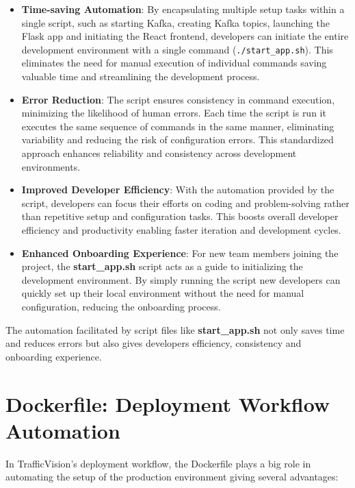 \begin{itemize}
    \item \textbf{Time-saving Automation}: By encapsulating multiple setup tasks within a single script, such as starting Kafka, creating Kafka topics, launching the Flask app and initiating the React frontend, developers can initiate the entire development environment with a single command (\texttt{./start\_app.sh}). This eliminates the need for manual execution of individual commands saving valuable time and streamlining the development process.
    
    \item \textbf{Error Reduction}: The script ensures consistency in command execution, minimizing the likelihood of human errors. Each time the script is run it executes the same sequence of commands in the same manner, eliminating variability and reducing the risk of configuration errors. This standardized approach enhances reliability and consistency across development environments.
    
    \item \textbf{Improved Developer Efficiency}: With the automation provided by the script, developers can focus their efforts on coding and problem-solving rather than repetitive setup and configuration tasks. This boosts overall developer efficiency and productivity enabling faster iteration and development cycles.
    
    \item \textbf{Enhanced Onboarding Experience}: For new team members joining the project, the \textbf{start\_app.sh} script acts as a guide to initializing the development environment. By simply running the script new developers can quickly set up their local environment without the need for manual configuration, reducing the onboarding process.
\end{itemize}

The automation facilitated by script files like \textbf{start\_app.sh} not only saves time and reduces errors but also gives developers efficiency, consistency and onboarding experience.

\section{Dockerfile: Deployment Workflow Automation}

In TrafficVision’s deployment workflow, the Dockerfile \cite{dockerfile} plays a big role in automating the setup of the production environment giving several advantages:

